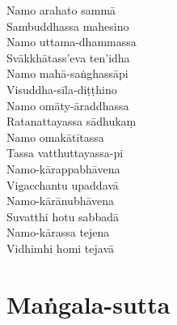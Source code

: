 \begin{paritta}
Namo arahato sammā\\
Sambuddhassa mahesino\\
Namo uttama-dhammassa\\
Svākkhātass'eva ten'idha\\
Namo mahā-saṅghassāpi\\
Visuddha-sīla-diṭṭhino\\
Namo omāty-āraddhassa\\
Ratanattayassa sādhukaṃ\\
Namo omakātītassa\\
Tassa vatthuttayassa-pi\\
Namo-kārappabhāvena\\
Vigacchantu upaddavā\\
Namo-kārānubhāvena\\
Suvatthi hotu sabbadā\\
Namo-kārassa tejena\\
Vidhimhi homi tejavā

%

\end{paritta}

\clearpage

\chapter{Maṅgala-sutta}%


